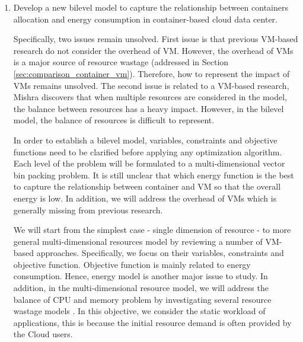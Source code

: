 \begin{enumerate}
	\item Develop a new bilevel model to capture the relationship between containers allocation and energy consumption in container-based cloud data center.

	 Specifically, two issues remain unsolved. First issue is that previous VM-based research do not consider the overhead of VM. However, the overhead of VMs is a major source of resource wastage (addressed in Section \ref{sec:comparison_container_vm}). Therefore, how to represent the impact of VMs remains unsolved.
	The second issue is related to a VM-based research,  Mishra \cite{Mishra:2011bz} discovers that when multiple resources are considered in the model, the balance between resources has a heavy impact. However, in the bilevel model, the balance of resources is difficult to represent. 



	In order to establish a bilevel model, variables, constraints and objective functions need to be clarified before applying any optimization algorithm. Each level of the problem will be formulated to a multi-dimensional vector bin packing problem. It is still unclear that which energy function is the best to capture the relationship between container and VM so that the overall energy is low. In addition, we will address the overhead of VMs which is generally missing from previous research.

	We will start from the simplest case - single dimension of resource - to more general multi-dimensional resources model by reviewing a number of VM-based approaches. Specifically, we focus on their variables, constraints and objective function. Objective function is mainly related to energy consumption. Hence, energy model is another major issue to study. In addition, in the multi-dimensional resource model, we will address the balance of CPU and memory problem by investigating several resource wastage models \cite{Ferdaus:2014ep, Xu:2010vh, Gao:2013gg}. In this objective, we consider the static workload of applications, this is because the initial resource demand is often provided by the Cloud users.


\end{enumerate}
